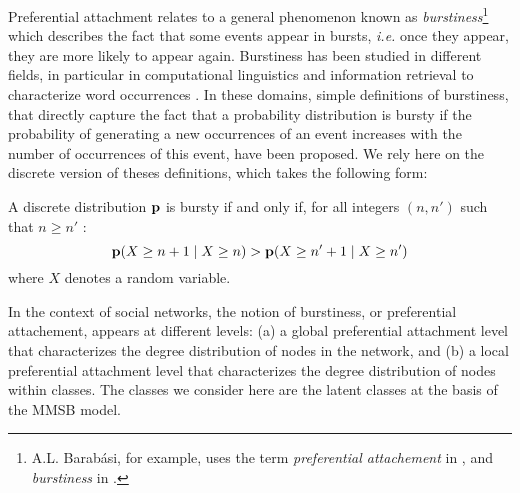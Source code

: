 Preferential attachment relates to a general phenomenon known as \textit{burstiness}\footnote{A.L. Barab\'asi, for example, uses the term \textit{preferential attachement} in \cite{barabasi1999emergence}, and \textit{burstiness} in \cite{barabasi_burst}.} which describes the fact that some events appear in bursts, \textit{i.e.} once they appear, they are more likely to appear again. 
%
%
Burstiness has been studied in different fields, in particular in computational linguistics and information retrieval to characterize word occurrences \cite{church1995poisson}. In these domains, simple definitions of burstiness, that directly capture the fact that a probability distribution is bursty if the probability of generating a new occurrences of an event increases with the number of occurrences of this event, have been proposed\cite{clinchant2008bnb,clinchant2010information}. We rely here on the discrete version of theses definitions, which takes the following form:
%
\begin{definition}[Burstiness]
	A discrete distribution $\mathbf{p}$ is bursty if and only if, for all integers $(n, n')$ such that $n \geq n'$ :
	\begin{equation}
	\mathbf{p}(X \geq n+1 \mid X \geq n) > \mathbf{p}(X \geq n'+1 \mid X \geq n') \nonumber
	\end{equation}
	where $X$ denotes a random variable.
\label{def:burst}
\end{definition}
%
In the context of social networks, the notion of burstiness, or preferential attachement, appears at different levels: (a) a global preferential attachment level that characterizes the degree distribution of nodes in the network, and (b) a local preferential attachment level that characterizes the degree distribution of nodes within classes. The classes we consider here are the latent classes at the basis of the MMSB model.
